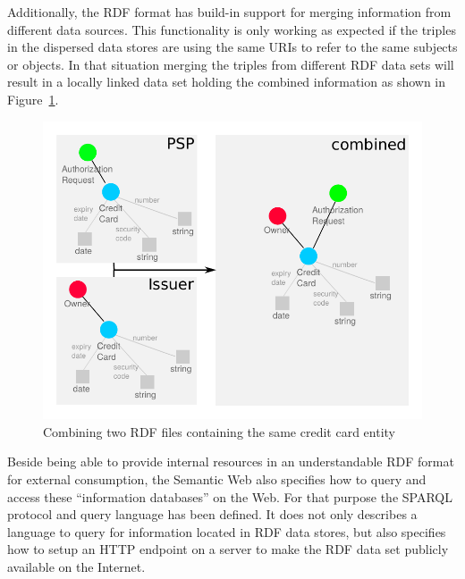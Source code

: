 Additionally, the \gls{RDF} format has build-in support for merging information from different data sources. This functionality is only working as expected if the triples in the dispersed data stores are using the same \gls{URI}s to refer to the same subjects or objects. In that situation merging the triples from different \gls{RDF} data sets will result in a locally linked data set holding the combined information as shown in Figure~\ref{fig:images_combine_rdf_graph}. \@

\begin{figure}[H]
	\centering
		\includegraphics[width=0.9\columnwidth]{images/combine_rdf_graph.pdf}
	\caption{Combining two \gls{RDF} files containing the same credit card entity}
\label{fig:images_combine_rdf_graph}
\end{figure}

Beside being able to provide internal resources in an understandable \gls{RDF} format for external consumption, the Semantic Web also specifies how to query and access these ``information databases'' on the Web. For that purpose the \gls{SPARQL} protocol and query language has been defined. It does not only describes a language to query for information located in \gls{RDF} data stores, but also specifies how to setup an \gls{HTTP} endpoint on a server to make the \gls{RDF} data set publicly available on the Internet. \\


